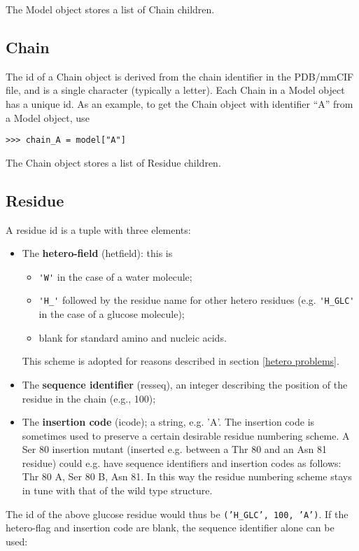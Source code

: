 The Model object stores a list of Chain children.

\subsection{Chain}

The id of a Chain object is derived from the chain identifier in the PDB/mmCIF
file, and is a single character (typically a letter). Each Chain in a Model object has a unique id. As an example, to get the Chain object with identifier ``A'' from a Model object, use
\begin{verbatim}
>>> chain_A = model["A"]
\end{verbatim}

The Chain object stores a list of Residue children.

\subsection{Residue}

A residue id is a tuple with three elements:

\begin{itemize}
\item The \textbf{hetero-field} (hetfield): this is
    \begin{itemize}
    \item \verb+'W'+ in the case of a water molecule;
    \item \verb+'H_'+ followed by the residue name for other hetero residues (e.g. \verb+'H_GLC'+ in the case of a glucose molecule);
    \item blank for standard amino and nucleic acids.
    \end{itemize}
This scheme is adopted for reasons described in section \ref{hetero problems}.
\item The \textbf{sequence identifier} (resseq), an integer describing the position of the residue in the chain (e.g., 100);
\item The \textbf{insertion code} (icode); a string, e.g. 'A'. The insertion code is sometimes used to preserve a certain desirable residue numbering scheme. A Ser 80 insertion mutant (inserted e.g. between a Thr 80 and an Asn 81
residue) could e.g. have sequence identifiers and insertion codes
as follows: Thr 80 A, Ser 80 B, Asn 81. In this way the residue numbering
scheme stays in tune with that of the wild type structure.
\end{itemize}
The id of the above glucose residue would thus be \texttt{('H\_GLC',
100, 'A')}. If the hetero-flag and insertion code are blank, the sequence
identifier alone can be used:

